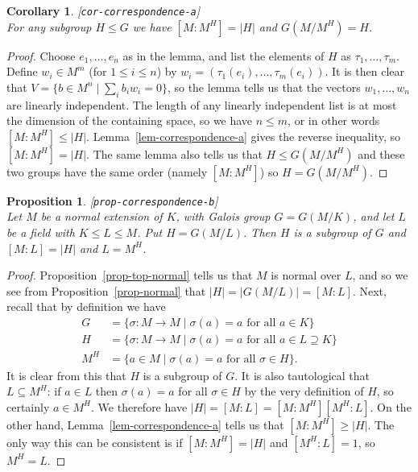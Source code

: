 \documentclass{amsart}
\newcommand{\lbl}[1]{\label{#1}\textup{[\texttt{#1}]}\ \\}
\newcommand{\lbl}{\label}
\newcommand{\sg}        {\sigma}
\newcommand{\st}        {\;|\;}
\newcommand{\sse}       {\subseteq}
\renewcommand{\:}{\colon}
\newtheorem{proposition}[theorem]{Proposition}
\newtheorem{corollary}[theorem]{Corollary}
\theoremstyle{definition}
\begin{document}
\begin{corollary}\lbl{cor-correspondence-a}
 For any subgroup $H\leq G$ we have $[M:M^H]=|H|$ and $G(M/M^H)=H$.
\end{corollary}
\begin{proof}
 Choose $e_1,\dotsc,e_n$ as in the lemma, and list the elements of $H$
 as $\tau_1,\dotsc,\tau_m$.  Define $w_i\in M^m$ (for $1\leq i\leq n$)
 by $w_i=(\tau_1(e_i),\dotsc,\tau_m(e_i))$.  It is then clear that
 $V=\{b\in M^n\st\sum_ib_iw_i=0\}$, so the lemma tells us that the
 vectors $w_1,\dotsc,w_n$ are linearly independent.  The length of any
 linearly independent list is at most the dimension of the containing
 space, so we have $n\leq m$, or in other words $[M:M^H]\leq |H|$.
 Lemma~\ref{lem-correspondence-a} gives the reverse inequality, so
 $[M:M^H]=|H|$.  The same lemma also tells us that $H\leq G(M/M^H)$
 and these two groups have the same order (namely $[M:M^H]$) so
 $H=G(M/M^H)$.  
\end{proof}

\begin{proposition}\lbl{prop-correspondence-b}
 Let $M$ be a normal extension of $K$, with Galois group $G=G(M/K)$,
 and let $L$ be a field with $K\leq L\leq M$.  Put $H=G(M/L)$.  Then
 $H$ is a subgroup of $G$ and $[M:L]=|H|$ and $L=M^H$.
\end{proposition}
\begin{proof}
 Proposition~\ref{prop-top-normal} tells us that $M$ is normal over
 $L$, and so we see from Proposition~\ref{prop-normal} that
 $|H|=|G(M/L)|=[M:L]$.  Next, recall that by definition we have 
 \begin{align*}
  G &= \{\sg\:M\to M\st \sg(a)=a\text{ for all } a\in K\} \\
  H &= \{\sg\:M\to M\st \sg(a)=a\text{ for all } a\in L\supseteq K\} \\
  M^H &= \{a\in M\st\sg(a)=a\text{ for all } \sg\in H\}.
 \end{align*}
 It is clear from this that $H$ is a subgroup of $G$.  It is also
 tautological that $L\sse M^H$: if $a\in L$ then $\sg(a)=a$ for all
 $\sg\in H$ by the very definition of $H$, so certainly $a\in M^H$.
 We therefore have $|H|=[M:L]=[M:M^H][M^H:L]$.  On the other hand,
 Lemma~\ref{lem-correspondence-a} tells us that $[M:M^H]\geq |H|$.
 The only way this can be consistent is if $[M:M^H]=|H|$ and
 $[M^H:L]=1$, so $M^H=L$.
\end{proof}
\end{document}
